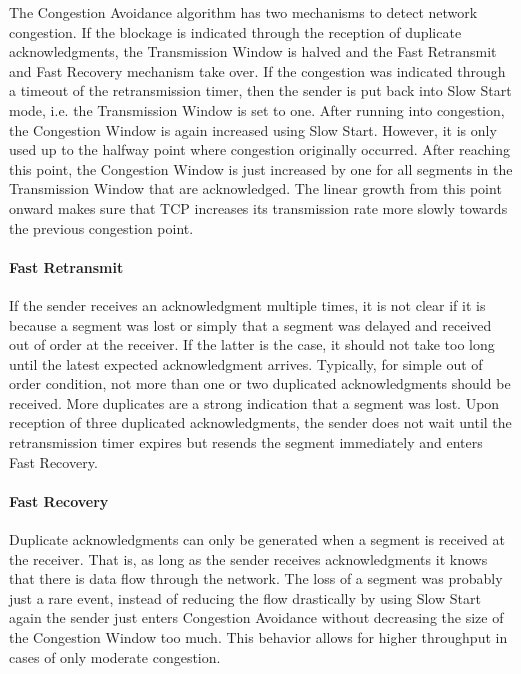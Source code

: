 The Congestion Avoidance algorithm has two mechanisms to detect network congestion. If the blockage is indicated through the reception of duplicate acknowledgments, the Transmission Window is halved and the Fast Retransmit and Fast Recovery mechanism take over. If the congestion was indicated through a timeout of the retransmission timer, then the sender is put back into Slow Start mode, i.e. the Transmission Window is set to one. After running into congestion, the Congestion Window is again increased using Slow Start. However, it is only used up to the halfway point where congestion originally occurred. After reaching this point, the Congestion Window is just increased by one for all segments in the Transmission Window that are acknowledged. The linear growth from this point onward makes sure that TCP increases its transmission rate more slowly towards the previous congestion point.  

\paragraph{Fast Retransmit}

If the sender receives an acknowledgment multiple times, it is not clear if it is because a segment was lost or simply that a segment was delayed and received out of order at the receiver. If the latter is the case, it should not take too long until the latest expected acknowledgment arrives. Typically, for simple out of order condition, not more than one or two duplicated acknowledgments should be received. More duplicates are a strong indication that a segment was lost. Upon reception of three duplicated acknowledgments, the sender does not wait until the retransmission timer expires but resends the segment immediately and enters Fast Recovery.

\paragraph{Fast Recovery}

Duplicate acknowledgments can only be generated when a segment is received at the receiver. That is, as long as the sender receives acknowledgments it knows that there is data flow through the network. The loss of a segment was probably just a rare event, instead of reducing the flow drastically by using Slow Start again the sender just enters Congestion Avoidance without decreasing the size of the Congestion Window too much. This behavior allows for higher throughput in cases of only moderate congestion.

